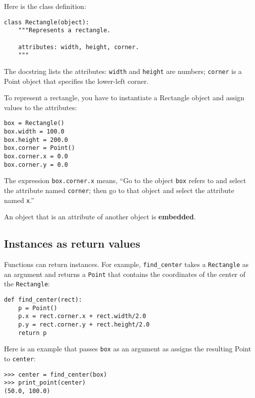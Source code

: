 \documentclass{article}
\begin{document}
Here is the class definition:
\begin{verbatim}
class Rectangle(object):
    """Represents a rectangle.

    attributes: width, height, corner.
    """
\end{verbatim}
The docstring lists the attributes: \verb|width| and \verb|height| are
numbers; \verb|corner| is a Point object that specifies the lower-left
corner.

To represent a rectangle, you have to instantiate a Rectangle object and
assign values to the attributes:
\begin{verbatim}
box = Rectangle()
box.width = 100.0
box.height = 200.0
box.corner = Point()
box.corner.x = 0.0
box.corner.y = 0.0
\end{verbatim}
The expression \verb|box.corner.x| means, ``Go to the object \verb|box|
refers to and select the attribute named \verb|corner|; then go to that
object and select the attribute named \verb|x|.''

An object that is an attribute of another object is {\bf embedded}.

\subsection{Instances as return values}
Functions can return instances. For example, \verb|find_center| takes a
\verb|Rectangle| as an argument and returns a \verb|Point| that contains
the coordinates of the center of the \verb|Rectangle|:
\begin{verbatim}
def find_center(rect):
    p = Point()
    p.x = rect.corner.x + rect.width/2.0
    p.y = rect.corner.y + rect.height/2.0
    return p
\end{verbatim}
Here is an example that passes \verb|box| as an argument as assigns the
resulting Point to \verb|center|:
\begin{verbatim}
>>> center = find_center(box)
>>> print_point(center)
(50.0, 100.0)
\end{verbatim}
\end{document}
